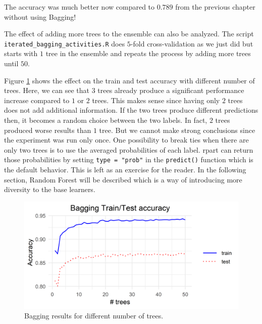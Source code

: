 \documentclass[
  11pt,
]{krantz}
\newenvironment{Shaded}{\begin{snugshade}}{\end{snugshade}}
\newcommand{\CommentTok}[1]{\textcolor[rgb]{0.37,0.37,0.37}{\textit{#1}}}
\newcommand{\FunctionTok}[1]{\textcolor[rgb]{0,0,0}{#1}}
\newcommand{\NormalTok}[1]{#1}
\newcommand{\SpecialCharTok}[1]{\textcolor[rgb]{0,0,0}{#1}}
\newcommand{\StringTok}[1]{\textcolor[rgb]{0.5,0.5,0.5}{#1}}
\begin{document}
\begin{Shaded}
\end{Shaded}

The accuracy was much better now compared to \(0.789\) from the previous chapter without using Bagging!

The effect of adding more trees to the ensemble can also be analyzed. The script \texttt{iterated\_bagging\_activities.R} does \(5\)-fold cross-validation as we just did but starts with \(1\) tree in the ensemble and repeats the process by adding more trees until \(50\).

Figure \ref{fig:iteratedBagging} shows the effect on the train and test accuracy with different number of trees. Here, we can see that \(3\) trees already produce a significant performance increase compared to \(1\) or \(2\) trees. This makes sense since having only \(2\) trees does not add additional information. If the two trees produce different predictions then, it becomes a random choice between the two labels. In fact, \(2\) trees produced worse results than \(1\) tree. But we cannot make strong conclusions since the experiment was run only once. One possibility to break ties when there are only two trees is to use the averaged probabilities of each label. rpart can return those probabilities by setting \texttt{type\ =\ "prob"} in the \texttt{predict()} function which is the default behavior. This is left as an exercise for the reader. In the following section, Random Forest will be described which is a way of introducing more diversity to the base learners.

\begin{figure}

{\centering \includegraphics[width=1\linewidth]{images/iterated_bagging} 

}

\caption{Bagging results for different number of trees.}\label{fig:iteratedBagging}
\end{figure}
\end{document}
